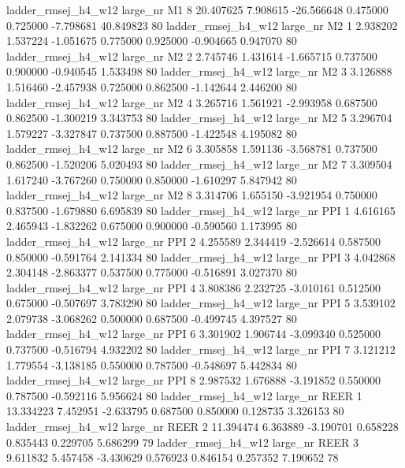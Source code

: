 ladder_rmsej_h4_w12   large_nr       M1                 8 20.407625  7.908615 -26.566648 0.475000 0.725000 -7.798681   40.849823 80
ladder_rmsej_h4_w12   large_nr       M2                 1  2.938202  1.537224  -1.051675 0.775000 0.925000 -0.904665    0.947070 80
ladder_rmsej_h4_w12   large_nr       M2                 2  2.745746  1.431614  -1.665715 0.737500 0.900000 -0.940545    1.533498 80
ladder_rmsej_h4_w12   large_nr       M2                 3  3.126888  1.516460  -2.457938 0.725000 0.862500 -1.142644    2.446200 80
ladder_rmsej_h4_w12   large_nr       M2                 4  3.265716  1.561921  -2.993958 0.687500 0.862500 -1.300219    3.343753 80
ladder_rmsej_h4_w12   large_nr       M2                 5  3.296704  1.579227  -3.327847 0.737500 0.887500 -1.422548    4.195082 80
ladder_rmsej_h4_w12   large_nr       M2                 6  3.305858  1.591136  -3.568781 0.737500 0.862500 -1.520206    5.020493 80
ladder_rmsej_h4_w12   large_nr       M2                 7  3.309504  1.617240  -3.767260 0.750000 0.850000 -1.610297    5.847942 80
ladder_rmsej_h4_w12   large_nr       M2                 8  3.314706  1.655150  -3.921954 0.750000 0.837500 -1.679880    6.695839 80
ladder_rmsej_h4_w12   large_nr      PPI                 1  4.616165  2.465943  -1.832262 0.675000 0.900000 -0.590560    1.173995 80
ladder_rmsej_h4_w12   large_nr      PPI                 2  4.255589  2.344419  -2.526614 0.587500 0.850000 -0.591764    2.141334 80
ladder_rmsej_h4_w12   large_nr      PPI                 3  4.042868  2.304148  -2.863377 0.537500 0.775000 -0.516891    3.027370 80
ladder_rmsej_h4_w12   large_nr      PPI                 4  3.808386  2.232725  -3.010161 0.512500 0.675000 -0.507697    3.783290 80
ladder_rmsej_h4_w12   large_nr      PPI                 5  3.539102  2.079738  -3.068262 0.500000 0.687500 -0.499745    4.397527 80
ladder_rmsej_h4_w12   large_nr      PPI                 6  3.301902  1.906744  -3.099340 0.525000 0.737500 -0.516794    4.932202 80
ladder_rmsej_h4_w12   large_nr      PPI                 7  3.121212  1.779554  -3.138185 0.550000 0.787500 -0.548697    5.442834 80
ladder_rmsej_h4_w12   large_nr      PPI                 8  2.987532  1.676888  -3.191852 0.550000 0.787500 -0.592116    5.956624 80
ladder_rmsej_h4_w12   large_nr     REER                 1 13.334223  7.452951  -2.633795 0.687500 0.850000  0.128735    3.326153 80
ladder_rmsej_h4_w12   large_nr     REER                 2 11.394474  6.363889  -3.190701 0.658228 0.835443  0.229705    5.686299 79
ladder_rmsej_h4_w12   large_nr     REER                 3  9.611832  5.457458  -3.430629 0.576923 0.846154  0.257352    7.190652 78
